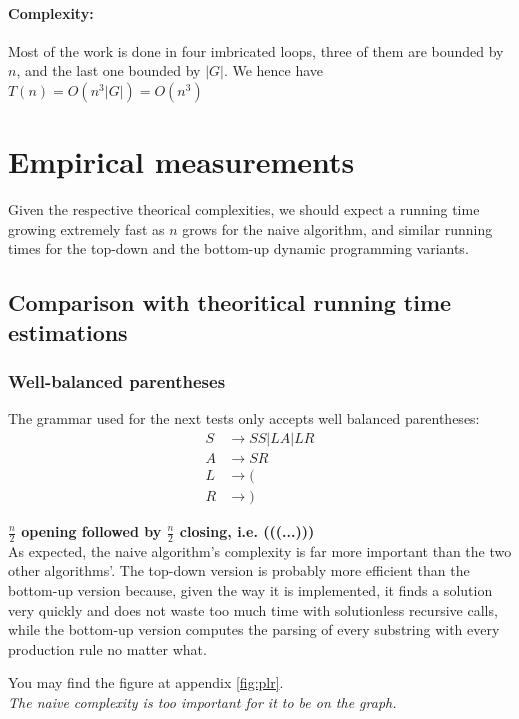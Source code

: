 \documentclass[twocolumn]{article}
\begin{document}
\paragraph{Complexity:}
Most of the work is done in four imbricated loops, three of them are bounded by $n$, and the last one
bounded by $|G|$.
We hence have $T(n)=O(n^3|G|)=O(n^3)$

\section{Empirical measurements}
Given the respective theorical complexities, we should expect a running time growing extremely fast as $n$ grows for the naive algorithm, and similar running times for the top-down and the bottom-up dynamic programming variants.
\subsection{Comparison with theoritical running time estimations}
\subsubsection{Well-balanced parentheses}
The grammar used for the next tests only accepts well balanced parentheses:
\begin{align*}
  S&\rightarrow SS | LA | LR\\
  A&\rightarrow SR\\
  L&\rightarrow (\\
  R&\rightarrow )
\end{align*}

\textbf{$\frac n2$ opening followed by $\frac n2$ closing, i.e. (((...)))}\\ 
As expected, the naive algorithm's complexity is far more important than the two
other algorithms'. The top-down version is probably more efficient than the
bottom-up version because,
given the way it is implemented, it finds a solution very quickly and does not
waste too much time with solutionless recursive calls, while the bottom-up
version computes the parsing of every substring with every production rule no
matter what.

You may find the figure at appendix \ref{fig:plr}.\\
\textit{The naive complexity is too important for it to be on the graph.}
\end{document}
